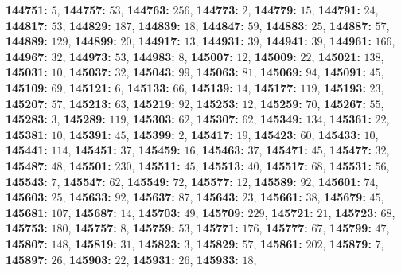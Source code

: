 \textsf{\bfseries 144751:} $5$, \textsf{\bfseries 144757:} $53$, \textsf{\bfseries 144763:} $256$, \textsf{\bfseries 144773:} $2$, \textsf{\bfseries 144779:} $15$, \textsf{\bfseries 144791:} $24$, \textsf{\bfseries 144817:} $53$, \textsf{\bfseries 144829:} $187$, \textsf{\bfseries 144839:} $18$, \textsf{\bfseries 144847:} $59$, \textsf{\bfseries 144883:} $25$, \textsf{\bfseries 144887:} $57$, \textsf{\bfseries 144889:} $129$, \textsf{\bfseries 144899:} $20$, \textsf{\bfseries 144917:} $13$, \textsf{\bfseries 144931:} $39$, \textsf{\bfseries 144941:} $39$, \textsf{\bfseries 144961:} $166$, \textsf{\bfseries 144967:} $32$, \textsf{\bfseries 144973:} $53$, \textsf{\bfseries 144983:} $8$, \textsf{\bfseries 145007:} $12$, \textsf{\bfseries 145009:} $22$, \textsf{\bfseries 145021:} $138$, \textsf{\bfseries 145031:} $10$, \textsf{\bfseries 145037:} $32$, \textsf{\bfseries 145043:} $99$, \textsf{\bfseries 145063:} $81$, \textsf{\bfseries 145069:} $94$, \textsf{\bfseries 145091:} $45$, \textsf{\bfseries 145109:} $69$, \textsf{\bfseries 145121:} $6$, \textsf{\bfseries 145133:} $66$, \textsf{\bfseries 145139:} $14$, \textsf{\bfseries 145177:} $119$, \textsf{\bfseries 145193:} $23$, \textsf{\bfseries 145207:} $57$, \textsf{\bfseries 145213:} $63$, \textsf{\bfseries 145219:} $92$, \textsf{\bfseries 145253:} $12$, \textsf{\bfseries 145259:} $70$, \textsf{\bfseries 145267:} $55$, \textsf{\bfseries 145283:} $3$, \textsf{\bfseries 145289:} $119$, \textsf{\bfseries 145303:} $62$, \textsf{\bfseries 145307:} $62$, \textsf{\bfseries 145349:} $134$, \textsf{\bfseries 145361:} $22$, \textsf{\bfseries 145381:} $10$, \textsf{\bfseries 145391:} $45$, \textsf{\bfseries 145399:} $2$, \textsf{\bfseries 145417:} $19$, \textsf{\bfseries 145423:} $60$, \textsf{\bfseries 145433:} $10$, \textsf{\bfseries 145441:} $114$, \textsf{\bfseries 145451:} $37$, \textsf{\bfseries 145459:} $16$, \textsf{\bfseries 145463:} $37$, \textsf{\bfseries 145471:} $45$, \textsf{\bfseries 145477:} $32$, \textsf{\bfseries 145487:} $48$, \textsf{\bfseries 145501:} $230$, \textsf{\bfseries 145511:} $45$, \textsf{\bfseries 145513:} $40$, \textsf{\bfseries 145517:} $68$, \textsf{\bfseries 145531:} $56$, \textsf{\bfseries 145543:} $7$, \textsf{\bfseries 145547:} $62$, \textsf{\bfseries 145549:} $72$, \textsf{\bfseries 145577:} $12$, \textsf{\bfseries 145589:} $92$, \textsf{\bfseries 145601:} $74$, \textsf{\bfseries 145603:} $25$, \textsf{\bfseries 145633:} $92$, \textsf{\bfseries 145637:} $87$, \textsf{\bfseries 145643:} $23$, \textsf{\bfseries 145661:} $38$, \textsf{\bfseries 145679:} $45$, \textsf{\bfseries 145681:} $107$, \textsf{\bfseries 145687:} $14$, \textsf{\bfseries 145703:} $49$, \textsf{\bfseries 145709:} $229$, \textsf{\bfseries 145721:} $21$, \textsf{\bfseries 145723:} $68$, \textsf{\bfseries 145753:} $180$, \textsf{\bfseries 145757:} $8$, \textsf{\bfseries 145759:} $53$, \textsf{\bfseries 145771:} $176$, \textsf{\bfseries 145777:} $67$, \textsf{\bfseries 145799:} $47$, \textsf{\bfseries 145807:} $148$, \textsf{\bfseries 145819:} $31$, \textsf{\bfseries 145823:} $3$, \textsf{\bfseries 145829:} $57$, \textsf{\bfseries 145861:} $202$, \textsf{\bfseries 145879:} $7$, \textsf{\bfseries 145897:} $26$, \textsf{\bfseries 145903:} $22$, \textsf{\bfseries 145931:} $26$, \textsf{\bfseries 145933:} $18$, 
